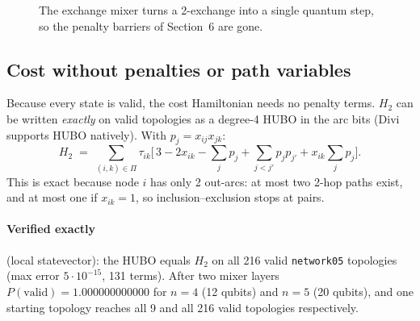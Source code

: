 \documentclass[11pt]{article}
\newcommand{\T}{\tau}
\newcommand{\Pairs}{\Pi}
\begin{document}
\begin{figure}[h]
\centering
{}
\caption{The exchange mixer turns a 2-exchange into a single quantum step, so the
penalty barriers of Section~6 are gone.}
\end{figure}

\subsection{Cost without penalties or path variables}
Because every state is valid, the cost Hamiltonian needs no penalty terms. $H_2$ can be
written \emph{exactly} on valid topologies as a degree-4 HUBO in the arc bits (Divi
supports HUBO natively). With $p_j = x_{ij}x_{jk}$:
\[
  H_2 \;=\; \sum_{(i,k)\in\Pairs}\T_{ik}\Big[\,3 - 2x_{ik} - \sum_j p_j + \sum_{j<j'} p_j p_{j'} + x_{ik}\sum_j p_j\Big].
\]
This is exact because node $i$ has only 2 out-arcs: at most two 2-hop paths exist, and at
most one if $x_{ik}=1$, so inclusion--exclusion stops at pairs.

\paragraph{Verified exactly} (local statevector): the HUBO equals $H_2$ on all 216 valid
\texttt{network05} topologies (max error $5\cdot10^{-15}$, 131 terms). After two mixer
layers $P(\text{valid})=1.000000000000$ for $n=4$ (12 qubits) and $n=5$ (20 qubits), and one
starting topology reaches all 9 and all 216 valid topologies respectively.
\end{document}
